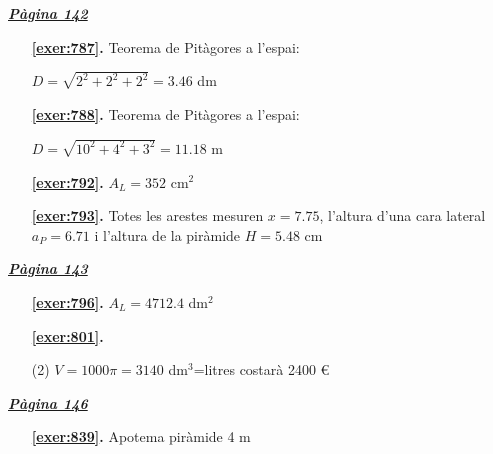 \hyperlink{page.142}{\textbf{\em Pàgina 142}}
\begin{enumerate}
\item[\fontfamily{phv}\selectfont\color{blue}\textbf{\ref{exer:787}. }] \label{ans:787} 
Teorema de Pitàgores a l'espai:\par $D=\sqrt {2^2+2^2+2^2}=3.46$ dm
 \end{enumerate}
\begin{enumerate}
\item[\fontfamily{phv}\selectfont\color{blue}\textbf{\ref{exer:788}. }] \label{ans:788} 
Teorema de Pitàgores a l'espai:\par $D=\sqrt {10^2+4^2+3^2}=11.18$ m
\item[\fontfamily{phv}\selectfont\color{blue}\textbf{\ref{exer:792}. }] \label{ans:792} 
$A_L=352$ cm$^2$
\item[\fontfamily{phv}\selectfont\color{blue}\textbf{\ref{exer:793}. }] \label{ans:793} 
Totes les arestes mesuren $x=7.75$, l'altura d'una cara lateral $a_P=6.71$ i l'altura de la piràmide $H=5.48$ cm
 \end{enumerate}
\vspace{0.3cm}


\hyperlink{page.143}{\textbf{\em Pàgina 143}}
\begin{enumerate}
\item[\fontfamily{phv}\selectfont\color{blue}\textbf{\ref{exer:796}. }] \label{ans:796} 
$A_L=4712.4$ dm$^2$
 \end{enumerate}
\begin{enumerate}



 \item[\fontfamily{phv}\selectfont\color{blue}\textbf{\ref{exer:801}. }] \label{ans:801}
 \begin{tasks}[column-sep=1em, item-indent=1.3333em](2)
	 \task* $V=1000\pi =3140$ dm$^3$=litres
	 \task costarà 2400 \euro {}
\end{tasks}
 \end{enumerate}
\vspace{0.3cm}


\hyperlink{page.146}{\textbf{\em Pàgina 146}}
\begin{enumerate}
\item[\fontfamily{phv}\selectfont\color{blue}\textbf{\ref{exer:839}. }] \label{ans:839} 
Apotema piràmide 4 m
 \end{enumerate}
\vspace{0.3cm}

